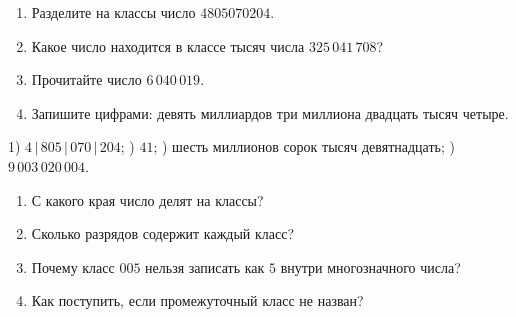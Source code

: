 \begin{practicebox}
  \begin{enumerate}
    \item Разделите на классы число \(4805070204\).
    \item Какое число находится в классе тысяч числа \(325\,041\,708\)?
    \item Прочитайте число \(6\,040\,019\).
    \item Запишите цифрами: девять миллиардов три миллиона двадцать тысяч четыре.
  \end{enumerate}
\end{practicebox}

\begin{notebox}[Ответы]
  1) \(4\,|\,805\,|\,070\,|\,204\); ) \(41\); ) шесть миллионов сорок тысяч девятнадцать; ) \(9\,003\,020\,004\).
\end{notebox}

\begin{questionsbox}
  \begin{enumerate}
    \item С какого края число делят на классы?
    \item Сколько разрядов содержит каждый класс?
    \item Почему класс \(005\) нельзя записать как \(5\) внутри многозначного числа?
    \item Как поступить, если промежуточный класс не назван?
  \end{enumerate}
\end{questionsbox}
